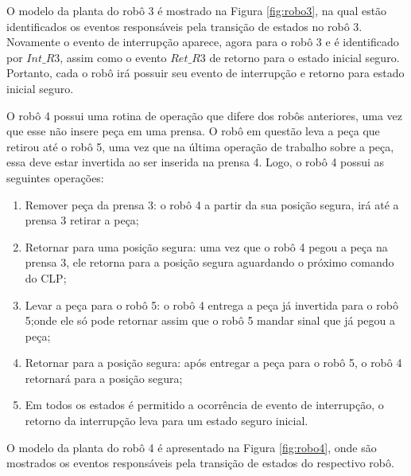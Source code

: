 O modelo da planta do robô 3 é mostrado na Figura \ref{fig:robo3}, na qual estão identificados os eventos responsáveis pela transição de estados no robô 3. Novamente o evento de interrupção aparece, agora para o robô 3 e é identificado por $Int\_R3$, assim como o evento $Ret\_R3$ de retorno para o estado inicial seguro. Portanto, cada o robô irá possuir seu evento de interrupção e retorno para estado inicial seguro.

O robô 4 possui uma rotina de operação que difere dos robôs anteriores, uma vez que esse não insere peça em uma prensa. O robô em questão leva a peça que retirou até o robô 5, uma vez que na última operação de trabalho sobre a peça, essa deve estar invertida ao ser inserida na prensa 4. Logo, o robô 4 possui as seguintes operações:

\begin{enumerate}
	\item Remover peça da prensa 3: o robô 4 a partir da sua posição segura, irá até a prensa 3 retirar a peça;
	
	\item Retornar para uma posição segura: uma vez que o robô 4 pegou a peça na prensa 3, ele retorna para a posição segura aguardando o próximo comando do CLP;
	
	\item Levar a peça para o robô 5: o robô 4 entrega a peça já invertida para o robô 5;onde ele só pode retornar assim que o robô 5 mandar sinal que já pegou a peça; 
	
	\item Retornar para a posição segura: após entregar a peça para o robô 5, o robô 4 retornará para a posição segura;
	
	\item Em todos os estados é permitido a ocorrência de evento de interrupção, o retorno da interrupção leva para um estado seguro inicial.
\end{enumerate}

O modelo da planta do robô 4 é apresentado na Figura \ref{fig:robo4}, onde são mostrados os eventos responsáveis pela transição de estados do respectivo robô.

